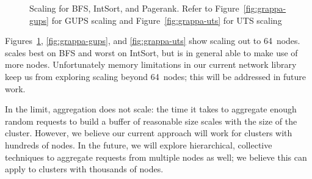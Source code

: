 \begin{figure}[ht]
    \begin{center}
      \qquad
      \qquad
      \qquad
    \end{center}
    \caption{Scaling for BFS, IntSort, and Pagerank. Refer to Figure~\ref{fig:grappa-gups} for GUPS scaling and Figure~\ref{fig:grappa-uts} for UTS scaling}
    \label{fig:grappa-scaling}
\end{figure}

Figures~\ref{fig:grappa-scaling}, \ref{fig:grappa-gups}, and
\ref{fig:grappa-uts} show scaling out to 64~nodes. \Grappa scales best
on BFS and worst on IntSort, but is in general able to make use of
more nodes. Unfortunately memory limitations in our current network
library keep us from exploring scaling beyond 64~nodes; this will be
addressed in future work.

In the limit, aggregation does not scale: the time it takes to
aggregate enough random requests to build a buffer of reasonable size
scales with the size of the cluster. However, we believe our current
approach will work for clusters with hundreds of nodes. In the future,
we will explore hierarchical, collective techniques to aggregate
requests from multiple nodes as well; we believe this can apply to
clusters with thousands of nodes.


